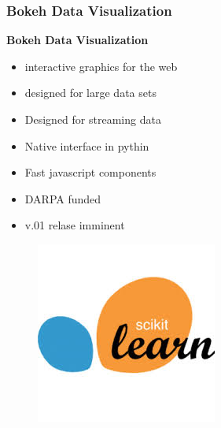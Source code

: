 \documentclass[MASTER.tex]{subfiles}
\begin{document}
\begin{frame}
	\frametitle{Bokeh Data Visualization}
	\textbf{Bokeh Data Visualization}
	\begin{itemize}
		\item interactive graphics for the web
		\item designed for large data sets
		\item Designed for streaming data
		\item Native interface in pythin
		\item Fast javascript components
		\item DARPA funded
		\item v.01 relase imminent
	\end{itemize}
	
\end{frame}


\begin{frame}
	\begin{figure}
\centering
\includegraphics[width=0.7\linewidth]{SKL-logo}

\end{figure}

\end{frame}
\end{document}
